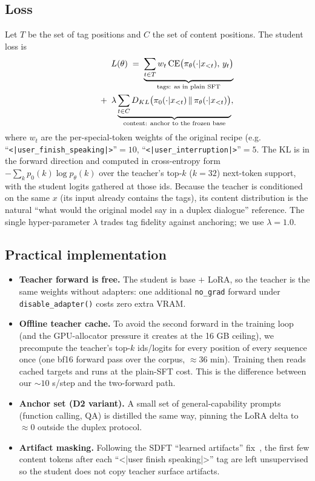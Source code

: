 \documentclass[conference]{IEEEtran}
\begin{document}
\subsection{Loss}
Let $T$ be the set of tag positions and $C$ the set of content positions. The
student loss is
\begin{equation}
\label{eq:loss}
\begin{split}
  L(\theta) \;=\;
  \underbrace{\sum_{\mathclap{t\in T}} w_t\, \mathrm{CE}\big(\pi_\theta(\cdot|x_{<t}),\, y_t\big)
  }_{\text{tags: as in plain SFT}}\\
  \qquad{}+{}\;
  \lambda\underbrace{\sum_{\mathclap{t\in C}} D_{KL}\big(
      \pi_0(\cdot|x_{<t}) \,\|\, \pi_\theta(\cdot|x_{<t})\big)
  }_{\text{content: anchor to the frozen base}},
\end{split}
\end{equation}
where $w_t$ are the per-special-token weights of the original recipe (e.g.
``\texttt{\textless|user\_finish\_speaking|\textgreater}''$=10$, ``\texttt{\textless|user\_interruption|\textgreater}''$=5$.
The KL is in the forward direction and computed in cross-entropy form
$-\sum_k p_0(k)\log p_\theta(k)$ over the teacher's top-$k$ ($k{=}32$) next-token
support, with the student logits gathered at those ids. Because the teacher is
conditioned on the same $x$ (its input already contains the tags), its content
distribution is the natural ``what would the original model say in a duplex
dialogue'' reference. The single hyper-parameter $\lambda$ trades tag fidelity
against anchoring; we use $\lambda{=}1.0$.

\subsection{Practical implementation}
\begin{itemize}
\item \textbf{Teacher forward is free.} The student is base $+$ LoRA, so the teacher
      is the same weights without adapters: one additional \texttt{no\_grad} forward
      under \texttt{disable\_adapter()} costs zero extra VRAM.
\item \textbf{Offline teacher cache.} To avoid the second forward in the training
      loop (and the GPU-allocator pressure it creates at the 16 GB ceiling), we
      precompute the teacher's top-$k$ ids/logits for every position of every
      sequence once (one bf16 forward pass over the corpus, $\approx$36 min). Training
      then reads cached targets and runs at the plain-SFT cost. This is the
      difference between our ${\sim}10$ s/step and the two-forward path.
\item \textbf{Anchor set (D2 variant).} A small set of general-capability prompts
      (function calling, QA) is distilled the same way, pinning the LoRA delta to
      $\approx 0$ outside the duplex protocol.
\item \textbf{Artifact masking.} Following the SDFT ``learned artifacts''
      fix~\cite{selfdistill2026}, the first few content tokens after each
      ``\textless|user finish speaking|>'' tag are left unsupervised so the student
      does not copy teacher surface artifacts.
\end{itemize}
\end{document}
